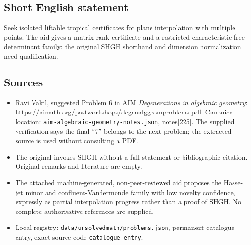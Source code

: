 \documentclass[11pt]{article}
\begin{document}
\subsection{Short English statement}
Seek isolated liftable tropical certificates for plane interpolation with multiple points. The aid gives a matrix-rank certificate and a restricted characteristic-free determinant family; the original SHGH shorthand and dimension normalization need qualification.
\subsection{Sources}
\begin{itemize}
\item Ravi Vakil, suggested Problem 6 in AIM \emph{Degenerations in algebraic geometry}: \url{https://aimath.org/pastworkshops/degenalggeomproblems.pdf}. Canonical location: \texttt{aim-algebraic-geometry-notes.json}, notes[225]. The supplied verification says the final ``7'' belongs to the next problem; the extracted source is used without consulting a PDF.
\item The original invokes SHGH without a full statement or bibliographic citation. Original remarks and literature are empty.
\item The attached machine-generated, non-peer-reviewed aid proposes the Hasse-jet minor and confluent-Vandermonde family with low novelty confidence, expressly as partial interpolation progress rather than a proof of SHGH. No complete authoritative references are supplied.
\item Local registry: \texttt{data/unsolvedmath/problems.json}, permanent catalogue entry, exact source code \texttt{catalogue entry}.
\end{itemize}
\end{document}
